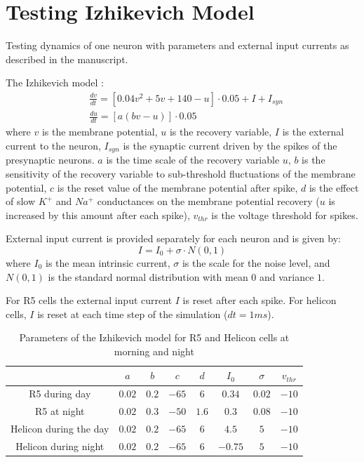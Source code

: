 \documentclass[../../report.tex]{subfiles}
\begin{document}
\section{Testing Izhikevich Model}

Testing dynamics of one neuron with parameters and external input currents as described in the manuscript.

The Izhikevich model \parencite{Izhikevich_2003}:
\begin{align}\label{eq_izhikevich_model}
    & \frac{dv}{dt} = \left[ 0.04v^2 + 5v + 140 - u \right] \cdot 0.05 + I + I_{syn} \\
    & \frac{du}{dt} = \left[ a (bv - u) \right] \cdot 0.05
\end{align}
where $v$ is the membrane potential, $u$ is the recovery variable, $I$ is the external current to the neuron, $I_{syn}$ is the synaptic current driven by the spikes of the presynaptic neurons. $a$ is the time scale of the recovery variable $u$, $b$ is the sensitivity of the recovery variable to sub-threshold fluctuations of the membrane potential, $c$ is the reset value of the membrane potential after spike, $d$ is the effect of slow $K^+$ and $Na^+$ conductances on the membrane potential recovery ($u$ is increased by this amount after each spike), $v_{thr}$ is the voltage threshold for spikes.

External input current is provided separately for each neuron and is given by:
\begin{equation}\label{eq_external_input_current}
    I = I_0 + \sigma \cdot N(0,1)
\end{equation}
where $I_0$ is the mean intrinsic current, $\sigma$ is the scale for the noise level, and $N(0,1)$ is the standard normal distribution with mean $0$ and variance $1$.

For R5 cells the external input current $I$ is reset after each spike. For helicon cells, $I$ is reset at each time step of the simulation ($dt=1ms$).

\begin{table}[!h]
    \centering
    \begin{tabular}{|c||c|c|c|c|c|c|c|}
        \hline
         & $a$ & $b$ & $c$ & $d$ & $I_0$ & $\sigma$ & $v_{thr}$ \\
         \hline
         \hline
        R5 during day & $0.02$ & $0.2$ & $-65$ & $6$ & $0.34$ & $0.02$ & $-10$ \\
        \hline
        R5 at night & $0.02$ & $0.3$ & $-50$ & $1.6$ & $0.3$ & $0.08$ & $-10$ \\
        \hline
        Helicon during the day & $0.02$ & $0.2$ & $-65$ & $6$ & $4.5$ & $5$ & $-10$ \\
        \hline
        Helicon during night & $0.02$ & $0.2$ & $-65$ & $6$ & $-0.75$ & $5$ & $-10$ \\
        \hline
    \end{tabular}
    \caption{Parameters of the Izhikevich model for R5 and Helicon cells at morning and night}
    \label{tab:my_label}
\end{table}
\end{document}

